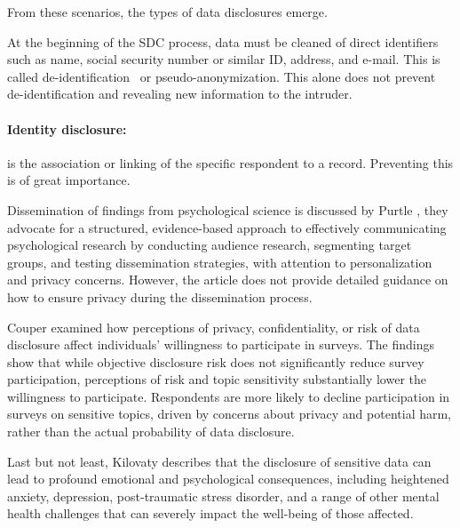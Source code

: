 \documentclass{article}
\begin{document}
From these scenarios, the types of data disclosures emerge.

At the beginning of the SDC process, data must be cleaned of direct identifiers such as name, social security number or similar ID, address, and e-mail. This is called de-identification~\cite{2001_Duncan} or pseudo-anonymization. This alone does not prevent de-identification and revealing new information to the intruder.





\paragraph{Identity disclosure:} is the association or linking of the specific respondent to a record. Preventing this is of great importance. 










Dissemination of findings from psychological science is discussed by Purtle \cite{2020_Purtle}, they advocate for a structured, evidence-based approach to effectively communicating psychological research by conducting audience research, segmenting target groups, and testing dissemination strategies, with attention to personalization and privacy concerns. However, the article does not provide detailed guidance on how to ensure privacy during the dissemination process.

Couper \cite{2008_Couper} examined how perceptions of privacy, confidentiality, or risk of data disclosure affect individuals' willingness to participate in surveys. The findings show that while objective disclosure risk does not significantly reduce survey participation, perceptions of risk and topic sensitivity substantially lower the willingness to participate. Respondents are more likely to decline participation in surveys on sensitive topics, driven by concerns about privacy and potential harm, rather than the actual probability of data disclosure.

Last but not least, Kilovaty \cite{2021_Kilovaty} describes that the disclosure of sensitive data can lead to profound emotional and psychological consequences, including heightened anxiety, depression, post-traumatic stress disorder, and a range of other mental health challenges that can severely impact the well-being of those affected.
\end{document}
